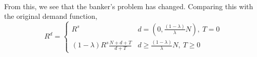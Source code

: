 \documentclass[12pt]{article}
\begin{document}
\begin{enumerate}
\begin{enumerate}
\begin{align*}
    \end{align*}
    From this, we see that the banker's problem has changed. Comparing this with the original demand function,
    \[ R^d = \begin{cases}
        R^s & d=\left( 0,\frac{(1-\lambda)}{\lambda}N\right), \ T=0
        \\ (1-\lambda) R^s \frac{N+d+T  }{d+T} & d \geq \frac{(1-\lambda)}{\lambda}N, \ T \geq 0
    \end{cases}
    \]
    

\end{enumerate}
\end{enumerate}
\end{document}
